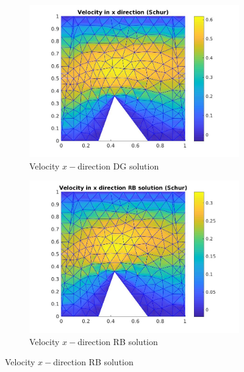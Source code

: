 \documentclass[a4paper,oneside,openright,spanish,english]{book}
\begin{document}
\begin{figure}[t!] %
\begin{subfigure}{0.48\textwidth}
\includegraphics[width=\linewidth]{offline_velocity_1_at_43_36.jpg}
\caption{Velocity $x-$direction DG solution} \label{vel_x_dg}
\end{subfigure}\hspace*{\fill}
\begin{subfigure}{0.48\textwidth}
\includegraphics[width=\linewidth]{online_velocity_1_at_43_36.jpg}
\caption{Velocity $x-$direction RB solution} \label{vel_x_rb}
\end{subfigure}


\end{figure}
\end{document}
